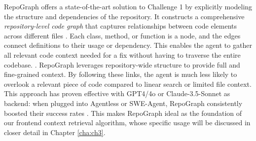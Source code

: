 
RepoGraph offers a state-of-the-art solution to Challenge 1 by explicitly modeling the structure and dependencies of the repository. It constructs a comprehensive \emph{repository-level code graph} that captures relationships between code elements across different files \cite{ouyang2025repographenhancingaisoftware}. Each class, method, or function is a node, and the edges connect definitions to their usage or dependency. This enables the agent to gather all relevant code context needed for a fix without having to traverse the entire codebase. . RepoGraph leverages repository-wide structure to provide full and fine-grained context. By following these links, the agent is much less likely to overlook a relevant piece of code compared to linear search or limited file context. This approach has proven effective with GPT4/4o or Claude-3.5-Sonnet as backend: when plugged into Agentless or SWE-Agent, RepoGraph consistently boosted their success rates \cite{ouyang2025repographenhancingaisoftware}. This makes RepoGraph ideal as the foundation of our frontend context retrieval algorithm, whose specific usage will be discussed in closer detail in Chapter \ref{cha:ch3}.

